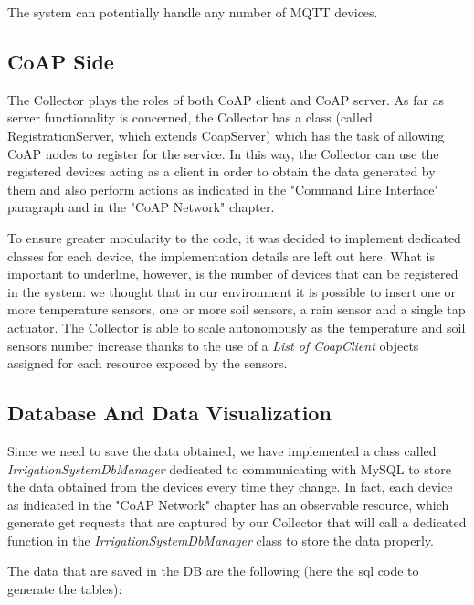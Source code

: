 The system can potentially handle any number of MQTT devices.



\subsection{CoAP Side}
The Collector plays the roles of both CoAP client and CoAP server. As far as server functionality is concerned, the Collector has a class (called RegistrationServer, which extends CoapServer) which has the task of allowing CoAP nodes to register for the service. In this way, the Collector can use the registered devices acting as a client in order to obtain the data generated by them and also perform actions as indicated in the "Command Line Interface" paragraph and in the "CoAP Network" chapter.

To ensure greater modularity to the code, it was decided to implement dedicated classes for each device, the implementation details are left out here. What is important to underline, however, is the number of devices that can be registered in the system: we thought that in our environment it is possible to insert one or more temperature sensors, one or more soil sensors, a rain sensor and a single tap actuator. The Collector is able to scale autonomously as the temperature and soil sensors number increase thanks to the use of a \textit{List of CoapClient} objects assigned for each resource exposed by the sensors.


\subsection{Database And Data Visualization}
Since we need to save the data obtained, we have implemented a class called \textit{IrrigationSystemDbManager} dedicated to communicating with MySQL to store the data obtained from the devices every time they change. In fact, each device as indicated in the "CoAP Network" chapter has an observable resource, which generate get requests that are captured by our Collector that will call a dedicated function in the \textit{IrrigationSystemDbManager} class to store the data properly.

The data that are saved in the DB are the following (here the sql code to generate the tables):


